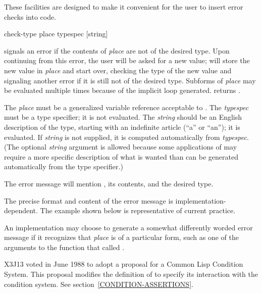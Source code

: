These facilities are designed to make it convenient for the user
to insert error checks into code.

\begin{defmac}
check-type place typespec [string]

\begin{obsolete}\noindent
{} signals an error if the contents of \emph{place} are not
of the desired type.
Upon continuing from this error, the user will be asked for a new value;
 will store the new value in \emph{place} and start over, 
checking the type of the new value and signaling
another error if it is still not of the desired type.  Subforms of
\emph{place} may be evaluated multiple times because of the implicit
loop generated.   returns {\false}.

The \emph{place} must be a generalized variable reference acceptable to
.
The \emph{typespec} must be a type specifier; it is not evaluated.
The \emph{string} should be an English description of the type, starting with
an indefinite article (``a'' or ``an''); it is evaluated.
If \emph{string} is
not supplied, it is computed automatically from \emph{typespec}.
(The optional \emph{string} argument is allowed because some applications
of  may require a more specific description of what is
wanted than can be generated automatically from the type specifier.)

The error message will mention , its contents, and the desired type.
\end{obsolete}

\begin{newer}
The precise format and content of the error message
is implementation-dependent.  The example shown below
is representative of current practice.
\end{newer}

\beforenoterule
\begin{implementation}
An implementation may choose to
generate a somewhat differently worded
error message if it recognizes that \emph{place} is of a particular
form, such as one of the arguments to
the function that called .
\end{implementation}
\afternoterule

\begin{new}
X3J13 voted in June 1988
to adopt a proposal for a Common Lisp Condition System. 
This proposal modifies the definition of  to specify its
interaction with the condition system.  See section~\ref{CONDITION-ASSERTIONS}.
\end{new}


\end{defmac}
